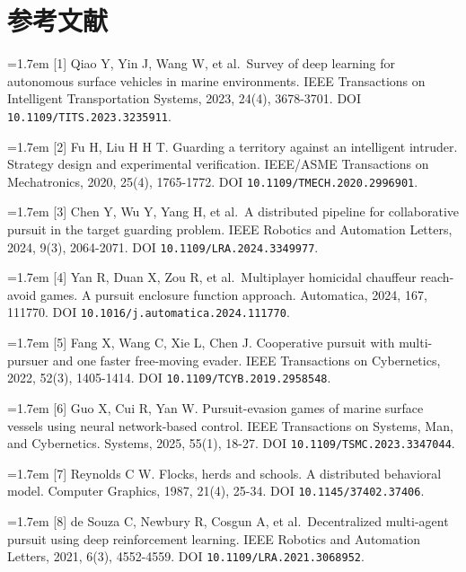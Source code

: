 \documentclass[UTF8,10.5pt,a4paper,fontset=none]{ctexart}
\begin{document}
\section{参考文献}\label{ux53c2ux8003ux6587ux732e}
\begingroup\small\raggedright\setlength{\parskip}{3pt}

\noindent\hangindent=1.7em [1] Qiao Y, Yin J, Wang W, et al.~Survey of deep learning for
autonomous surface vehicles in marine environments. IEEE Transactions on
Intelligent Transportation Systems, 2023, 24(4), 3678-3701. DOI \nolinkurl{10.1109/TITS.2023.3235911}.

\noindent\hangindent=1.7em [2] Fu H, Liu H H T. Guarding a territory against an intelligent
intruder. Strategy design and experimental verification. IEEE/ASME
Transactions on Mechatronics, 2020, 25(4), 1765-1772. DOI \nolinkurl{10.1109/TMECH.2020.2996901}.

\noindent\hangindent=1.7em [3] Chen Y, Wu Y, Yang H, et al.~A distributed pipeline for
collaborative pursuit in the target guarding problem. IEEE Robotics and
Automation Letters, 2024, 9(3), 2064-2071. DOI \nolinkurl{10.1109/LRA.2024.3349977}.

\noindent\hangindent=1.7em [4] Yan R, Duan X, Zou R, et al.~Multiplayer homicidal chauffeur
reach-avoid games. A pursuit enclosure function approach. Automatica,
2024, 167, 111770. DOI \nolinkurl{10.1016/j.automatica.2024.111770}.

\noindent\hangindent=1.7em [5] Fang X, Wang C, Xie L, Chen J. Cooperative pursuit with
multi-pursuer and one faster free-moving evader. IEEE Transactions on
Cybernetics, 2022, 52(3), 1405-1414. DOI \nolinkurl{10.1109/TCYB.2019.2958548}.

\noindent\hangindent=1.7em [6] Guo X, Cui R, Yan W. Pursuit-evasion games of marine surface
vessels using neural network-based control. IEEE Transactions on
Systems, Man, and Cybernetics. Systems, 2025, 55(1), 18-27. DOI \nolinkurl{10.1109/TSMC.2023.3347044}.

\noindent\hangindent=1.7em [7] Reynolds C W. Flocks, herds and schools. A distributed
behavioral model. Computer Graphics, 1987, 21(4), 25-34. DOI \nolinkurl{10.1145/37402.37406}.

\noindent\hangindent=1.7em [8] de Souza C, Newbury R, Cosgun A, et al.~Decentralized
multi-agent pursuit using deep reinforcement learning. IEEE Robotics and
Automation Letters, 2021, 6(3), 4552-4559. DOI \nolinkurl{10.1109/LRA.2021.3068952}.
\end{document}
